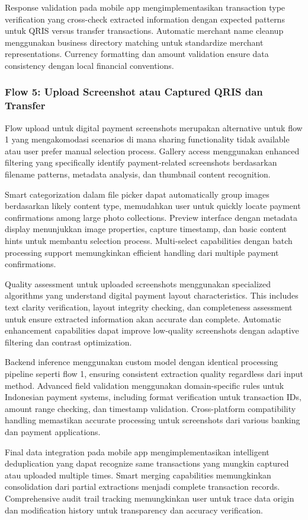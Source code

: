 Response validation pada mobile app mengimplementasikan transaction type verification yang cross-check extracted information dengan expected patterns untuk QRIS versus transfer transactions. Automatic merchant name cleanup menggunakan business directory matching untuk standardize merchant representations. Currency formatting dan amount validation ensure data consistency dengan local financial conventions.

\subsubsection{Flow 5: Upload Screenshot atau Captured QRIS dan Transfer}
\label{subsubsec:flow-upload-digital}

Flow upload untuk digital payment screenshots merupakan alternative untuk flow 1 yang mengakomodasi scenarios di mana sharing functionality tidak available atau user prefer manual selection process. Gallery access menggunakan enhanced filtering yang specifically identify payment-related screenshots berdasarkan filename patterns, metadata analysis, dan thumbnail content recognition.

Smart categorization dalam file picker dapat automatically group images berdasarkan likely content type, memudahkan user untuk quickly locate payment confirmations among large photo collections. Preview interface dengan metadata display menunjukkan image properties, capture timestamp, dan basic content hints untuk membantu selection process. Multi-select capabilities dengan batch processing support memungkinkan efficient handling dari multiple payment confirmations.

Quality assessment untuk uploaded screenshots menggunakan specialized algorithms yang understand digital payment layout characteristics. This includes text clarity verification, layout integrity checking, dan completeness assessment untuk ensure extracted information akan accurate dan complete. Automatic enhancement capabilities dapat improve low-quality screenshots dengan adaptive filtering dan contrast optimization.

Backend inference menggunakan custom model dengan identical processing pipeline seperti flow 1, ensuring consistent extraction quality regardless dari input method. Advanced field validation menggunakan domain-specific rules untuk Indonesian payment systems, including format verification untuk transaction IDs, amount range checking, dan timestamp validation. Cross-platform compatibility handling memastikan accurate processing untuk screenshots dari various banking dan payment applications.

Final data integration pada mobile app mengimplementasikan intelligent deduplication yang dapat recognize same transactions yang mungkin captured atau uploaded multiple times. Smart merging capabilities memungkinkan consolidation dari partial extractions menjadi complete transaction records. Comprehensive audit trail tracking memungkinkan user untuk trace data origin dan modification history untuk transparency dan accuracy verification.
